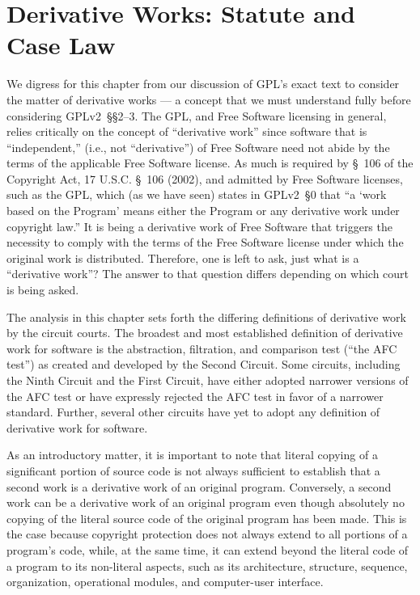 
\chapter{Derivative Works: Statute and Case Law}
\label{derivative-works}

We digress for this chapter from our discussion of GPL's exact text to
consider the matter of derivative works --- a concept that we must
understand fully before considering GPLv2~\S\S2--3\@. The GPL, and Free
Software licensing in general, relies critically on the concept of
``derivative work'' since software that is ``independent,'' (i.e., not
``derivative'') of Free Software need not abide by the terms of the
applicable Free Software license. As much is required by \S~106 of the
Copyright Act, 17 U.S.C. \S~106 (2002), and admitted by Free Software
licenses, such as the GPL, which (as we have seen) states in GPLv2~\S0 that ``a
`work based on the Program' means either the Program or any derivative
work under copyright law.'' It is being a derivative work of Free Software
that triggers the necessity to comply with the terms of the Free Software
license under which the original work is distributed. Therefore, one is
left to ask, just what is a ``derivative work''? The answer to that
question differs depending on which court is being asked.

The analysis in this chapter sets forth the differing definitions of
derivative work by the circuit courts. The broadest and most
established definition of derivative work for software is the
abstraction, filtration, and comparison test (``the AFC test'') as
created and developed by the Second Circuit. Some circuits, including
the Ninth Circuit and the First Circuit, have either adopted narrower
versions of the AFC test or have expressly rejected the AFC test in
favor of a narrower standard. Further, several other circuits have yet
to adopt any definition of derivative work for software.

As an introductory matter, it is important to note that literal copying of
a significant portion of source code is not always sufficient to establish
that a second work is a derivative work of an original
program. Conversely, a second work can be a derivative work of an original
program even though absolutely no copying of the literal source code of
the original program has been made. This is the case because copyright
protection does not always extend to all portions of a program's code,
while, at the same time, it can extend beyond the literal code of a
program to its non-literal aspects, such as its architecture, structure,
sequence, organization, operational modules, and computer-user interface.

